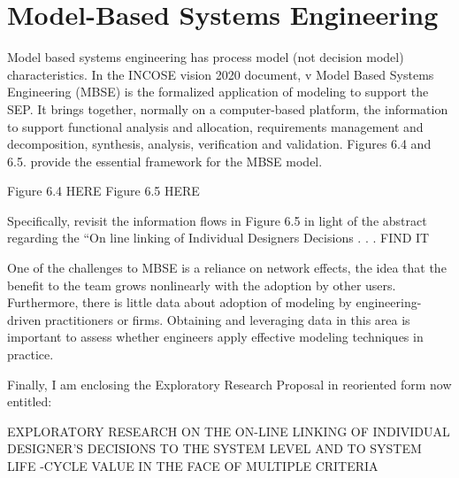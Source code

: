 \section{Model-Based Systems Engineering}

Model based systems engineering has process model (not decision model) characteristics. In the INCOSE vision 2020 document, v Model Based Systems Engineering (MBSE) is the formalized application of modeling to support the SEP. It brings together, normally on a computer-based platform, the information to support functional analysis and allocation, requirements management and decomposition, synthesis, analysis, verification and validation. Figures 6.4 and 6.5. provide the essential framework for the MBSE model.

Figure 6.4 HERE
Figure 6.5 HERE
	
Specifically, revisit the information flows in Figure 6.5 in light of the abstract regarding the “On line linking of Individual Designers Decisions . . . FIND IT

One of the challenges to MBSE is a reliance on network effects, the idea that the benefit to the team grows nonlinearly with the adoption by other users. Furthermore, there is little data about adoption of modeling by engineering-driven practitioners or firms. Obtaining and leveraging data in this area is important to assess whether engineers apply effective modeling techniques in practice.

Finally, I am enclosing the Exploratory Research Proposal in reoriented form now entitled:

EXPLORATORY RESEARCH ON THE ON-LINE LINKING OF
INDIVIDUAL DESIGNER’S DECISIONS TO THE SYSTEM LEVEL AND
TO SYSTEM LIFE -CYCLE VALUE IN THE FACE OF MULTIPLE CRITERIA

